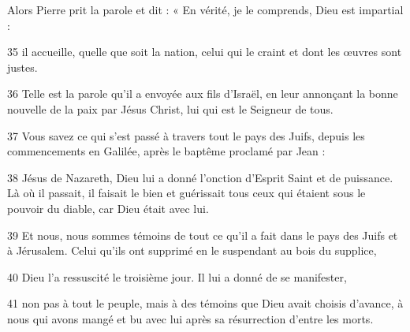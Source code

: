 Alors Pierre prit la parole et dit : « En vérité, je le comprends, Dieu est impartial :

35 il accueille, quelle que soit la nation, celui qui le craint et dont les œuvres sont justes.

36 Telle est la parole qu’il a envoyée aux fils d’Israël, en leur annonçant la bonne nouvelle de la paix par Jésus Christ, lui qui est le Seigneur de tous.

37 Vous savez ce qui s’est passé à travers tout le pays des Juifs, depuis les commencements en Galilée, après le baptême proclamé par Jean :

38 Jésus de Nazareth, Dieu lui a donné l’onction d’Esprit Saint et de puissance. Là où il passait, il faisait le bien et guérissait tous ceux qui étaient sous le pouvoir du diable, car Dieu était avec lui.

39 Et nous, nous sommes témoins de tout ce qu’il a fait dans le pays des Juifs et à Jérusalem. Celui qu’ils ont supprimé en le suspendant au bois du supplice,

40 Dieu l’a ressuscité le troisième jour. Il lui a donné de se manifester,

41 non pas à tout le peuple, mais à des témoins que Dieu avait choisis d’avance, à nous qui avons mangé et bu avec lui après sa résurrection d’entre les morts.